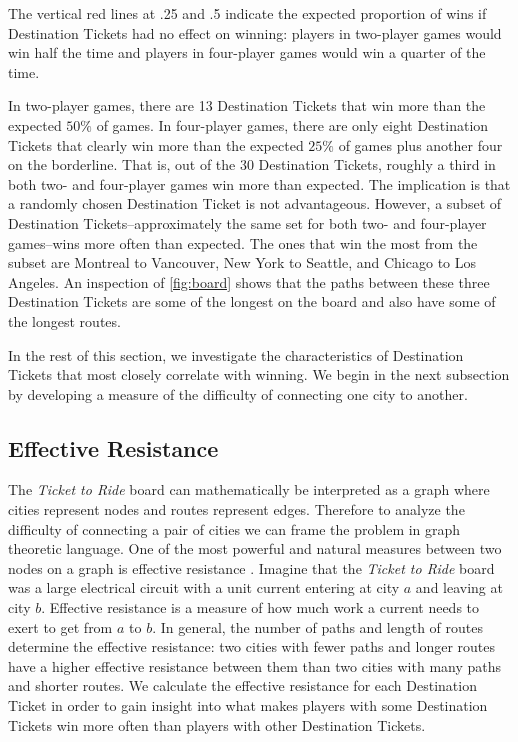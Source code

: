 \begin{multicols}{2}

The vertical red lines at .25 and .5 indicate
the expected proportion of wins if Destination Tickets
had no effect on winning: players in two-player games
would win half the time and players in four-player games
would win a quarter of the time.

In two-player games, there are 13 Destination Tickets 
that win more than the expected $50\%$ of games.
In four-player games, there are only eight Destination Tickets
that clearly win more than the expected $25\%$ of games plus
another four on the borderline.
That is, out of the 30 Destination Tickets, roughly a third
in both two- and four-player games win more than expected.
The implication is that a randomly chosen Destination 
Ticket is not advantageous.
However, a subset of Destination Tickets--approximately the same
set for both two- and four-player games--wins more often than expected.
The ones that win the most from the subset are Montreal to Vancouver,
New York to Seattle, and Chicago to Los Angeles.
An inspection of \cref{fig:board} shows that the paths between 
these three Destination Tickets are some of the longest on the board 
and also have some of the longest routes.

In the rest of this section, we investigate the characteristics of
Destination Tickets that most closely correlate with
winning.
We begin in the next subsection by developing a measure
of the difficulty of connecting one city to another.

\subsection{Effective Resistance}
The \textit{Ticket to Ride} board can mathematically
be interpreted as a graph where cities represent
nodes and routes represent edges.
Therefore to analyze the difficulty of connecting a
pair of cities we can frame the problem in graph theoretic language.
One of the most powerful and natural measures
between two nodes on a graph is effective resistance
\cite{ellens2011effective}.
Imagine that the \textit{Ticket to Ride} board was
a large electrical circuit with a unit current
entering at city $a$ and leaving at city $b$.
Effective resistance is a measure
of how much work a current needs to exert
to get from $a$ to $b$.
In general, the number of paths and length of routes 
determine the effective resistance:
two cities with fewer paths and longer routes
have a higher effective resistance between them
than two cities with many paths and shorter routes.
We calculate the effective resistance for each 
Destination Ticket in order to gain insight
into what makes players with some Destination Tickets
win more often than players with other Destination Tickets.


\end{multicols}

